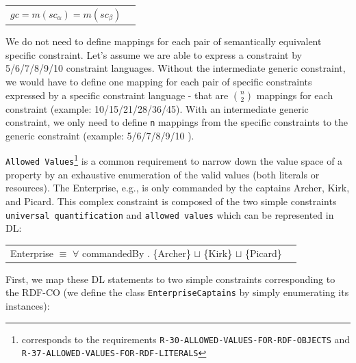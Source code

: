 \documentclass{llncs}
\newcommand{\ms}[1]{\texttt{#1}}
\newenvironment{gcotable}{
  \scriptsize
  \sffamily
  \vspace{0.3cm}
	\begin{center}
  \begin{tabular}{l|l|l|l|l|l|l}
  \hline
  \textbf{c. type} & \textbf{context class} & \textbf{left p. list} & \textbf{right p. list} & \textbf{classes} & \textbf{c. element} & \textbf{c. value} \\
  \hline

}{
  \hline
  \end{tabular}
	\end{center}
}
\newenvironment{DL}{
  \vspace{0.3cm}
	\begin{center}
  \begin{tabular}{r l}

}{
  \end{tabular}
	\end{center}
}
\begin{document}
\begin{DL}
$ gc = m(sc_{\alpha}) = m(sc_{\beta}) $
\end{DL}

We do not need to define mappings for each pair of semantically equivalent specific constraint.
Let's assume we are able to express a constraint by 5/6/7/8/9/10 constraint languages.
Without the intermediate generic constraint, we would have to define one mapping for each pair of specific constraints expressed by a specific constraint language
- that are \ms{\( {n \choose 2} \)} mappings for each constraint (example: 10/15/21/28/36/45).
With an intermediate generic constraint, we only need to define \ms{n} mappings from the specific constraints to the generic constraint (example: 5/6/7/8/9/10 ).



\ms{Allowed Values}\footnote{corresponds to the requirements \ms{R-30-ALLOWED-VALUES-FOR-RDF-OBJECTS} and \ms{R-37-ALLOWED-VALUES-FOR-RDF-LITERALS}}
is a common requirement to narrow down the value space of a property by an exhaustive enumeration of the valid values (both literals or resources). 
The Enterprise, e.g., is only commanded by the captains Archer, Kirk, and Picard.
This complex constraint is composed of the two simple constraints \ms{universal quantification} and \ms{allowed values} which can be represented in DL:


\begin{DL}
Enterprise $\equiv$ $\forall$ commandedBy . \{Archer\} $\sqcup$ \{Kirk\} $\sqcup$ \{Picard\}
\end{DL}

First, we map these DL statements to two simple constraints corresponding to the RDF-CO (we define the class \ms{EnterpriseCaptains} by simply enumerating its instances):

\end{document}
